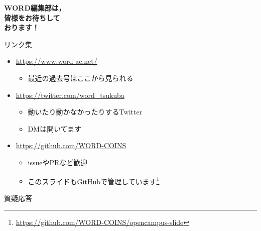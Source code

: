 \documentclass[lualatex]{beamer}
\begin{document}
\begin{frame}[plain]
 \begin{center}
  \Huge\textbf{WORD編集部は，\\皆様をお待ちして\\おります！}
 \end{center}
\end{frame}
\begin{frame}[plain]{リンク集}
 \begin{itemize}
  \item \url{https://www.word-ac.net/}
  \begin{itemize}
   \item 最近の過去号はここから見られる
  \end{itemize}
  \item \url{https://twitter.com/word\_tsukuba}
  \begin{itemize}
   \item 動いたり動かなかったりするTwitter
   \item DMは開いてます
  \end{itemize}
  \item \url{https://github.com/WORD-COINS}
  \begin{itemize}
   \item issueやPRなど歓迎
   \item このスライドもGitHubで管理しています\footnote{\url{https://github.com/WORD-COINS/opencampus-slide}}
  \end{itemize}
 \end{itemize}
\end{frame}
\begin{frame}[plain]
 \begin{center}
  質疑応答
 \end{center}
\end{frame}
\end{document}
